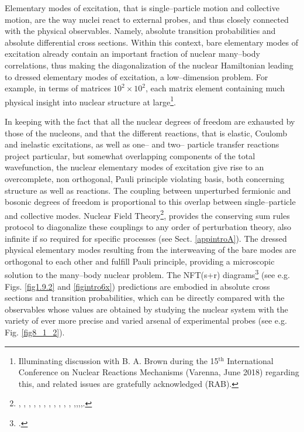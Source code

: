 Elementary modes of excitation, that is single--particle motion and collective motion, are the way nuclei react to external probes, and thus closely connected with the  physical observables. Namely, absolute transition probabilities and absolute differential cross sections. Within this context, bare elementary modes of excitation already contain an important fraction of nuclear many--body correlations,  thus making the diagonalization of the nuclear Hamiltonian leading to dressed elementary modes of excitation, a low--dimension problem. For example, in terms of matrices $10^2\times10^2$, each matrix element containing much  physical insight into nuclear structure at large\footnote{Illuminating discussion with B. A. Brown during the 15$^{\text{th}}$ International Conference on Nuclear Reactions Mechanisms (Varenna, June 2018) regarding this, and related issues are gratefully acknowledged (RAB).}. 


In keeping with the fact that all the nuclear degrees of freedom are exhausted by those of the nucleons, and that the different reactions, that is elastic, Coulomb and inelastic excitations, as well as  one-- and two-- particle transfer reactions project particular, but somewhat
 overlapping  components of the total wavefunction, the nuclear elementary modes of excitation give  rise to an overcomplete, non orthogonal, Pauli principle violating basis, both concerning structure as well as reactions. The coupling between unperturbed fermionic and bosonic degrees of freedom is proportional to this overlap between single--particle and collective modes. Nuclear Field Theory\footnote{\cite{Bes:74}, \cite{Bes:76a}, \cite{Bes:76b}, \cite{Bes:76c}, \cite{Bes:75}, \cite{Broglia:76}, \cite{Bes:75b}, \cite{Mottelson:76}, \cite{Bes:77}, \cite{Bortignon:77}, \cite{Bortignon:78}, \cite{Broglia:04a},\cite{Reinhardt:75},\cite{Reinhardt:78a},\cite{Reinhardt:78b},\cite{Reinhardt:80}.}, provides the conserving sum rules protocol to diagonalize these couplings  to any order of perturbation theory, also infinite if so required for specific processes (see Sect. \ref{appintroA}). The dressed physical elementary modes resulting from the interweaving of the bare modes are orthogonal to each other and fulfill Pauli principle, providing a microscopic solution to the many--body nuclear problem. 
 The NFT(s+r) diagrams\footnote{\cite{Broglia:75,Broglia:04a,Broglia:16}.} (see e.g. Figs. \ref{fig1.9.2} and  \ref{figintro6x}) predictions are embodied in absolute cross sections and transition probabilities, which can be directly compared with the observables whose values are obtained by studying the nuclear system with  the variety of ever more precise and varied arsenal of experimental probes (see e.g. Fig. \ref{fig8_1_2}). 

